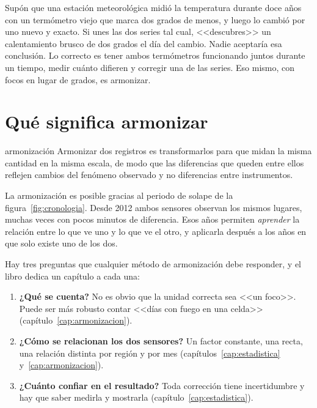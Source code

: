 \begin{intuicion}
Supón que una estación meteorológica midió la temperatura durante doce años con un termómetro
viejo que marca dos grados de menos, y luego lo cambió por uno nuevo y exacto. Si unes las dos
series tal cual, <<descubres>> un calentamiento brusco de dos grados el día del cambio. Nadie
aceptaría esa conclusión. Lo correcto es tener ambos termómetros funcionando juntos durante un
tiempo, medir cuánto difieren y corregir una de las series. Eso mismo, con focos en lugar de
grados, es armonizar.
\end{intuicion}

\section{Qué significa armonizar}

\begin{definicion}{armonización}
Armonizar dos registros es transformarlos para que midan la misma cantidad en la misma escala,
de modo que las diferencias que queden entre ellos reflejen cambios del fenómeno observado y no
diferencias entre instrumentos.
\end{definicion}

La armonización es posible gracias al periodo de solape de la figura~\ref{fig:cronologia}.
Desde 2012 ambos sensores observan los mismos lugares, muchas veces con pocos minutos de
diferencia. Esos años permiten \emph{aprender} la relación entre lo que ve uno y lo que ve el
otro, y aplicarla después a los años en que solo existe uno de los dos.

Hay tres preguntas que cualquier método de armonización debe responder, y el libro dedica un
capítulo a cada una:

\begin{enumerate}
  \item \textbf{¿Qué se cuenta?} No es obvio que la unidad correcta sea <<un foco>>. Puede ser
  más robusto contar <<días con fuego en una celda>> (capítulo~\ref{cap:armonizacion}).
  \item \textbf{¿Cómo se relacionan los dos sensores?} Un factor constante, una recta, una
  relación distinta por región y por mes (capítulos~\ref{cap:estadistica}
  y~\ref{cap:armonizacion}).
  \item \textbf{¿Cuánto confiar en el resultado?} Toda corrección tiene incertidumbre y hay que
  saber medirla y mostrarla (capítulo~\ref{cap:estadistica}).
\end{enumerate}

